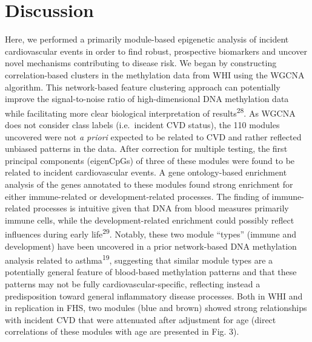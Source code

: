 \documentclass[]{article}
\theoremstyle{definition}
\theoremstyle{definition}
\theoremstyle{definition}
\theoremstyle{remark}
\begin{document}
\section{Discussion}\label{discussion}

Here, we performed a primarily module-based epigenetic analysis of
incident cardiovascular events in order to find robust, prospective
biomarkers and uncover novel mechanisms contributing to disease risk. We
began by constructing correlation-based clusters in the methylation data
from WHI using the WGCNA algorithm. This network-based feature
clustering approach can potentially improve the signal-to-noise ratio of
high-dimensional DNA methylation data while facilitating more clear
biological interpretation of results\textsuperscript{28}. As WGCNA does
not consider class labels (i.e.~incident CVD status), the 110 modules
uncovered were not \emph{a priori} expected to be related to CVD and
rather reflected unbiased patterns in the data. After correction for
multiple testing, the first principal components (eigenCpGs) of three of
these modules were found to be related to incident cardiovascular
events. A gene ontology-based enrichment analysis of the genes annotated
to these modules found strong enrichment for either immune-related or
development-related processes. The finding of immune-related processes
is intuitive given that DNA from blood measures primarily immune cells,
while the development-related enrichment could possibly reflect
influences during early life\textsuperscript{29}. Notably, these two
module ``types'' (immune and development) have been uncovered in a prior
network-based DNA methylation analysis related to
asthma\textsuperscript{19}, suggesting that similar module types are a
potentially general feature of blood-based methylation patterns and that
these patterns may not be fully cardiovascular-specific, reflecting
instead a predisposition toward general inflammatory disease processes.
Both in WHI and in replication in FHS, two modules (blue and brown)
showed strong relationships with incident CVD that were attenuated after
adjustment for age (direct correlations of these modules with age are
presented in Fig. 3).
\end{document}

